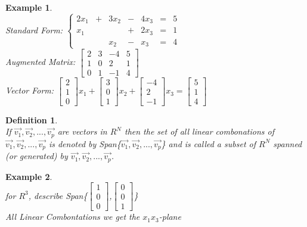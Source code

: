 \documentclass[a4paper,12pt]{book}
\theoremstyle{defn}
\newtheorem{defn}{Definition}[section]
\theoremstyle{expl}
\newtheorem{expl}{Example}[section]
\begin{document}
\begin{expl}\-\\
\textup{
Standard Form: $\left\{ \begin{array}{ccccccc}
2x_1&+&3x_2&-&4x_3&=&5\\
x_1& & &+& 2x_3&=&1\\
 & & x_2 & - &x_3&=&4
\end{array}
\right.$\\
Augmented Matrix:
$\left[ \begin{array}{ccc|c}
2&3&-4&5\\
1&0&2&1\\
0&1&-1&4
\end{array}
\right]$\\
Vector Form:
$\left[ \begin{array}{c} 2\\1\\0 \end{array} \right]x_1+
\left[ \begin{array}{c} 3\\0\\1 \end{array} \right]x_2+
\left[ \begin{array}{c} -4\\2\\-1 \end{array} \right]x_3=
\left[ \begin{array}{c} 5\\1\\4 \end{array} \right]$
}\end{expl}
\begin{defn}\-\\
\textup{
If $\vec{v_1},\vec{v_2},...,\vec{v_p}$ are vectors in $R^N$ then the set of all linear combonations of $\vec{v_1},\vec{v_2},...,\vec{v_p}$ is denoted by Span\{$\vec{v_1},\vec{v_2},...,\vec{v_p}$\} and is called a subset of $R^N$ spanned (or generated) by $\vec{v_1},\vec{v_2},...,\vec{v_p}$.
}\end{defn}
\begin{expl}\-\\
\textup{
for $R^3$, describe Span\{$\left[\begin{array}{c}1\\0\\0\end{array}\right]$,$\left[\begin{array}{c}0\\0\\1\end{array}\right]$\}\\
All Linear Combontations we get the $x_1x_3$-plane\\
}\end{expl}
\end{document}
